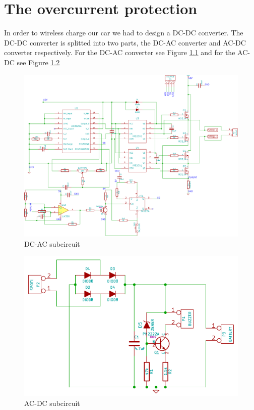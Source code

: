 \documentclass[final]{scrreprt} %
\begin{document}
\chapter{The overcurrent protection}
In order to wireless charge our car we had to design a DC-DC converter. The DC-DC converter is splitted into two parts, the DC-AC converter and AC-DC converter respectively. 
For the DC-AC converter see Figure \ref{fig:DC-AC} and for the AC-DC see Figure \ref{fig:AC-DC}

\begin{figure}[h]
	\includegraphics[width=\linewidth]{resources/DC-AC-rc.pdf}
	\caption{DC-AC subcircuit}
	\label{fig:DC-AC}
\end{figure}

\begin{figure}[h]
	\includegraphics[width=\linewidth]{resources/AC-DC-rc.pdf}
	\caption{AC-DC subcircuit}
	\label{fig:AC-DC}
\end{figure}
\end{document}
